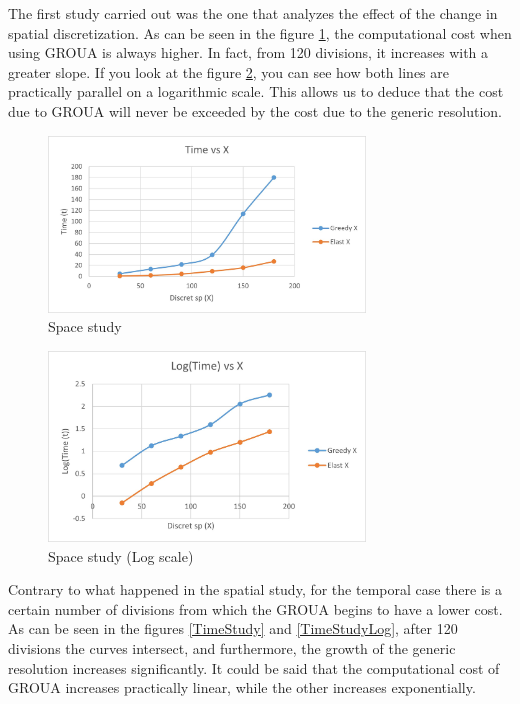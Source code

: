 \documentclass[a4paper, 10pt]{article}
\begin{document}

The first study carried out was the one that analyzes the effect of the change in spatial discretization. As can be seen in the figure \ref{SpaceStudy}, the computational cost when using GROUA is always higher. In fact, from 120 divisions, it increases with a greater slope. If you look at the figure \ref{SpaceStudyLog}, you can see how both lines are practically parallel on a logarithmic scale. This allows us to deduce that the cost due to GROUA will never be exceeded by the cost due to the generic resolution.

\begin{figure}
\centering
\includegraphics[width=0.75\textwidth]{SpaceStudy.jpg}
\caption{Space study} 
\label{SpaceStudy}
\end{figure}

\begin{figure}
\centering
\includegraphics[width=0.75\textwidth]{SpaceStudyLog.jpg}
\caption{Space study (Log scale)} 
\label{SpaceStudyLog}
\end{figure}


Contrary to what happened in the spatial study, for the temporal case there is a certain number of divisions from which the GROUA begins to have a lower cost. As can be seen in the figures \ref{TimeStudy} and \ref{TimeStudyLog}, after 120 divisions the curves intersect, and furthermore, the growth of the generic resolution increases significantly. It could be said that the computational cost of GROUA increases practically linear, while the other increases exponentially.
\end{document}
